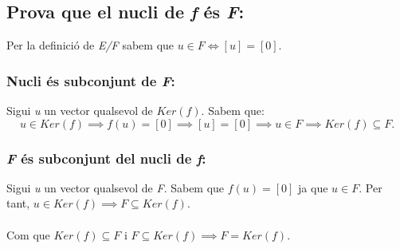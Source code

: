 \documentclass[a4paper, 11pt]{article}
\begin{document}
        \subsection{Prova que el nucli de \emph{f} \'es \emph{F}:}
            Per la definici\'o de \emph{E/F} sabem que ${u\in F \iff [u] = [0]}$.

            \subsubsection{Nucli \'es subconjunt de \emph{F}:}
                Sigui \emph{u} un vector qualsevol de ${Ker(f)}$. Sabem que:
                \begin{equation*}
                    u \in Ker(f) \implies f(u) = [0] \implies [u] = [0] \implies u\in F \implies Ker(f) \subseteq F.
                \end{equation*}

            \subsubsection{\emph{F} \'es subconjunt del nucli de \emph{f}:}
                Sigui \emph{u} un vector qualsevol de \emph{F}. Sabem que ${f(u) = [0]}$ ja que ${u\in F}$. Per tant, ${u \in Ker(f) \implies F \subseteq Ker(f)}$.\\\\
            Com que ${Ker(f) \subseteq F \text{ i } F \subseteq Ker(f) \implies F = Ker(f)}$.
\end{document}
